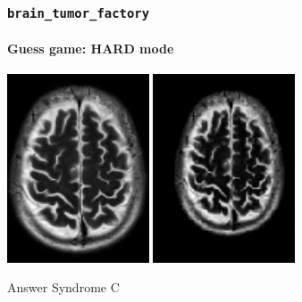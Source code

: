 \documentclass[]{beamer}
\newcommand{\btf}{\tt{brain\_tumor\_factory}}
\begin{document}
\begin{frame}
  \frametitle{\btf}
  \framesubtitle{Guess game: HARD mode}
  \begin{minipage}{\linewidth}
    \begin{center}
      \includegraphics[width=4.2cm]{resources/brain_base}
      \includegraphics[width=4.2cm]{resources/c2}
    \end{center}
  \end{minipage}
  \pause
  \begin{block}{Answer}
    Syndrome C
  \end{block}
\end{frame}
\end{document}
